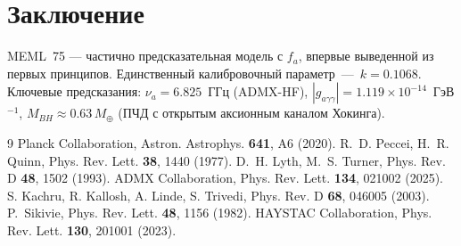 \documentclass[12pt,a4paper]{article}
\numberwithin{equation}{section}
\begin{document}
\section{Заключение}
MEML~75 — частично предсказательная модель с $f_a$, впервые выведенной 
из первых принципов. Единственный калибровочный параметр~---~$k = 0.1068$. 
Ключевые предсказания: $\nu_a = 6.825$~ГГц (ADMX-HF), 
$|g_{a\gamma\gamma}| = 1.119\times 10^{-14}$~ГэВ$^{-1}$, 
$M_{BH} \approx 0.63\,M_\oplus$ (ПЧД с открытым аксионным каналом Хокинга).

\begin{thebibliography}{9}
 Planck Collaboration, Astron. Astrophys. \textbf{641}, A6 (2020).
 R.~D. Peccei, H.~R. Quinn, Phys. Rev. Lett. \textbf{38}, 1440 (1977).
 D.~H. Lyth, M.~S. Turner, Phys. Rev. D \textbf{48}, 1502 (1993).
 ADMX Collaboration, Phys. Rev. Lett. \textbf{134}, 021002 (2025).
 S. Kachru, R. Kallosh, A. Linde, S. Trivedi, Phys. Rev. D \textbf{68}, 046005 (2003).
 P.~Sikivie, Phys. Rev. Lett. \textbf{48}, 1156 (1982).
 HAYSTAC Collaboration, Phys. Rev. Lett. \textbf{130}, 201001 (2023).
\end{thebibliography}
\end{document}
